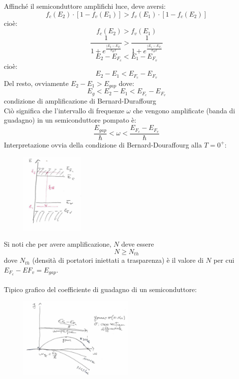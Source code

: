 \documentclass{book}
\def \w {\omega}
\theoremstyle{remark}
\begin{document}
Affinché il semiconduttore amplifichi luce, deve aversi:
\begin{equation*}
f_c(E_2) \cdot [1 - f_v(E_1)] > f_v(E_1) \cdot [1 - f_c(E_2)]
\end{equation*}
cioè:
\begin{equation*}
f_c(E_2) > f_v(E_1)
\end{equation*}
\begin{equation*}
\frac{1}{1 + e^\frac{(E_2 - E_{F_c}}{k_BT}} > \frac{1}{1 + e^\frac{(E_1 - E_{F_v}}{k_BT}}
\end{equation*}
\begin{equation*}
E_2 - E_{F_c} < E_1 - E_{F_v}
\end{equation*}
cioè:
\begin{equation*}
E_2 - E_1 < E_{F_c} - E_{F_v}
\end{equation*}
Del resto, ovviamente $E_2 - E_1 > E_{gap}$ dove:
\begin{equation*}
E_g < E_2 - E_1 < E_{F_c} - E_{F_v}
\end{equation*}
condizione di amplificazione di Bernard-Duraffourg\\
Ciò significa che l'intervallo di frequenze $\w$ che vengono amplificate (banda di guadagno) in un semiconduttore pompato è:
\begin{equation*}
\frac{E_{gap}}{\hbar} < \w < \frac{E_{F_c} - E_{F_v}}{\hbar}
\end{equation*}
Interpretazione ovvia della condizione di Bernard-Douraffourg alla $T=0^+$:
\begin{figure}[H]
\centering
\includegraphics[height=4cm]{images/laser_80_7}
\end{figure}
\noindent
Si noti che per avere amplificazione, $N$ deve essere
\begin{equation*}
N \geq N_{th}
\end{equation*}
dove $N_{th}$ (densità di portatori iniettati a trasparenza) è il valore di $N$ per cui $E_{F_c} - E{F_v} = E_{gap}$.\\
\\
Tipico grafico del coefficiente di guadagno di un semiconduttore:
\begin{figure}[H]
\centering
\includegraphics[height=4cm]{images/laser_80_8}
\end{figure}

\end{document}
